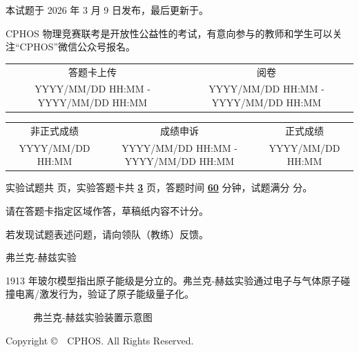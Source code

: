 \documentclass[exam]{../cphos-e}
\begin{document}
\maketitlepage

{\kaiti\small 本试题于 2026 年 3 月 9 日发布，最后更新于\compiletime 。}

{\kaiti\small CPHOS 物理竞赛联考是开放性公益性的考试，有意向参与的教师和学生可以关注“CPHOS”微信公众号报名。}

\begin{examschedule}
\begin{tabular}{@{}cc@{}}
    答题卡上传 & 阅卷 \\
    YYYY/MM/DD HH:MM - YYYY/MM/DD HH:MM & YYYY/MM/DD HH:MM - YYYY/MM/DD HH:MM \\
\end{tabular}

\vspace{0.3em}

\begin{tabular}{@{}ccc@{}}
    非正式成绩 & 成绩申诉 & 正式成绩 \\
    YYYY/MM/DD HH:MM & YYYY/MM/DD HH:MM - YYYY/MM/DD HH:MM & YYYY/MM/DD HH:MM \\
\end{tabular}
\end{examschedule}

\begin{examnotes}
    \item 实验试题共 \textbf{\underline{\cphostotalpages}} 页，实验答题卡共 \textbf{\underline{3}} 页，答题时间 \textbf{\underline{60}} 分钟，试题满分 \textbf{\underline{\cphostotalscore}} 分。
    \item 请在答题卡指定区域作答，草稿纸内容不计分。
    \item 若发现试题表述问题，请向领队（教练）反馈。
\end{examnotes}

\vspace{1em}

\begin{problem}[40]{弗兰克-赫兹实验}
\begin{expcontent}
1913 年玻尔模型指出原子能级是分立的。弗兰克-赫兹实验通过电子与气体原子碰撞电离/激发行为，验证了原子能级量子化。

\begin{figure}[H]
    \centering
    \caption{弗兰克-赫兹实验装置示意图}
    \label{fig:fh-device}
\end{figure}


\end{expcontent}
\end{problem}

\begin{copyrightinfo}
\begin{center}
\small
Copyright \copyright\ \the\year\ CPHOS. All Rights Reserved.
\end{center}
\end{copyrightinfo}
\end{document}
